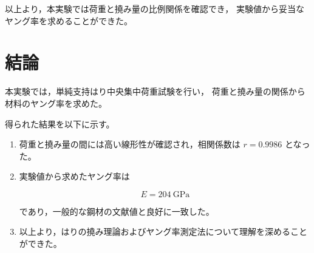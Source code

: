 \documentclass[10pt,a4paper,titlepage]{jreport}
\begin{document}
以上より，本実験では荷重と撓み量の比例関係を確認でき，
実験値から妥当なヤング率を求めることができた。

\chapter{結論}

本実験では，単純支持はり中央集中荷重試験を行い，
荷重と撓み量の関係から材料のヤング率を求めた。

得られた結果を以下に示す。

\begin{enumerate}
    \item 荷重と撓み量の間には高い線形性が確認され，相関係数は $r=0.9986$ となった。

    \item 実験値から求めたヤング率は

    \[
    E = 204\ \mathrm{GPa}
    \]

    であり，一般的な鋼材の文献値と良好に一致した。

    \item 以上より，はりの撓み理論およびヤング率測定法について理解を深めることができた。
\end{enumerate}
\end{document}

